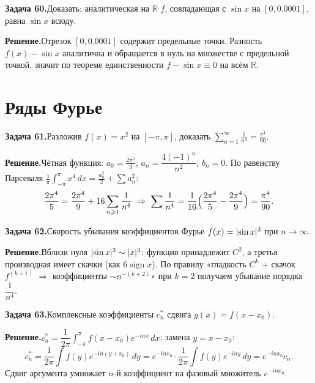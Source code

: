 \documentclass[10pt,a4paper]{article}
\DeclareMathOperator{\sign}{sign}
\newcommand{\R}{\mathbb{R}}
\newcommand{\dx}{\,dx}
\renewcommand{\ge}{\geqslant}
\DeclarePairedDelimiter{\abs}{\lvert}{\rvert}
\theoremstyle{definition}
\theoremstyle{plain}
\newcommand{\writespace}{\vspace{7.5mm}}
\newcommand{\task}[2]{%
  \par\writespace\noindent
  \textbf{\textcolor{accent}{Задача #1.}}\enspace #2\par\smallskip}
\newcommand{\sol}{\par\noindent\textbf{Решение.}\enspace}
\begin{document}
\task{60}{Доказать: аналитическая на $\R$ $f$, совпадающая с $\sin x$ на $[0,0.0001]$, равна $\sin x$ всюду.}
\sol Отрезок $[0,0.0001]$ содержит предельные точки. Разность $f(x)-\sin x$ аналитична и обращается
в нуль на множестве с предельной точкой, значит по теореме единственности $f-\sin x\equiv0$ на всём
$\R$.

\section{Ряды Фурье}

\task{61}{Разложив $f(x)=x^2$ на $[-\pi,\pi]$, доказать $\displaystyle\sum_{n=1}^\infty\frac1{n^4}=\frac{\pi^4}{90}$.}
\sol Чётная функция: $a_0=\tfrac{2\pi^2}{3}$, $a_n=\dfrac{4(-1)^n}{n^2}$, $b_n=0$. По равенству
Парсеваля $\tfrac1\pi\int_{-\pi}^\pi x^4\dx=\tfrac{a_0^2}{2}+\sum a_n^2$:
\[
  \frac{2\pi^4}{5}=\frac{2\pi^4}{9}+16\sum_{n\ge1}\frac1{n^4}
  \ \Rightarrow\ \sum\frac1{n^4}=\frac1{16}\Bigl(\frac{2\pi^4}{5}-\frac{2\pi^4}{9}\Bigr)=\frac{\pi^4}{90}.
\]

\task{62}{Скорость убывания коэффициентов Фурье $f(x)=\abs{\sin x}^3$ при $n\to\infty$.}
\sol Вблизи нуля $\abs{\sin x}^3\sim\abs x^3$: функция принадлежит $C^2$, а третья производная имеет
скачки (как $6\sign x$). По правилу «гладкость $C^k$ + скачок $f^{(k+1)}$ $\Rightarrow$ коэффициенты
$\sim n^{-(k+2)}$» при $k=2$ получаем убывание порядка $\dfrac1{n^4}$.

\task{63}{Комплексные коэффициенты $c_n^{*}$ сдвига $g(x)=f(x-x_0)$.}
\sol $c_n^{*}=\dfrac1{2\pi}\int_{-\pi}^\pi f(x-x_0)e^{-inx}\dx$; замена $y=x-x_0$:
\[
  c_n^{*}=\frac1{2\pi}\int f(y)e^{-in(y+x_0)}\,dy=e^{-inx_0}\cdot\frac1{2\pi}\int f(y)e^{-iny}\,dy
  =e^{-inx_0}c_n.
\]
Сдвиг аргумента умножает $n$-й коэффициент на фазовый множитель $e^{-inx_0}$.
\end{document}
